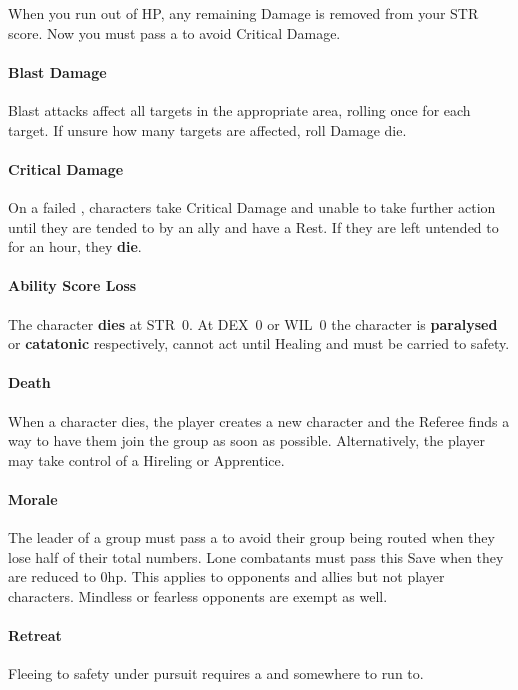 \documentclass[itdr]{subfiles}
\begin{document}
When you run out of HP, any remaining Damage is removed from your STR score. Now you must pass a  to avoid Critical Damage.

\vfill
\paragraph{Blast Damage}
Blast attacks affect all targets in the appropriate area, rolling once for each target. If unsure how many targets are affected, roll Damage die.

\vfill
\paragraph{Critical Damage}
On a failed , characters take Critical Damage and unable to take further action until they are tended to by an ally and have a Rest. If they are left untended to for an hour, they \textbf{die}.

\vfill
\paragraph{Ability Score Loss}
The character \textbf{dies} at STR~0. At DEX~0 or WIL~0 the character is \textbf{paralysed} or \textbf{catatonic} respectively, cannot act until Healing and must be carried to safety.

\vfill
\paragraph{Death}
When a character dies, the player creates a new character and the Referee finds a way to have them join the group as soon as possible. Alternatively, the player may take control of a Hireling or Apprentice.

\vfill
\paragraph{Morale}
The leader of a group must pass a  to avoid their group being routed when they lose half of their total numbers. Lone combatants must pass this Save when they are reduced to 0hp. This applies to opponents and allies but not player characters. Mindless or fearless opponents are exempt as well.

\vfill
\paragraph{Retreat}
Fleeing to safety under pursuit requires a  and somewhere to run to.
\end{document}
